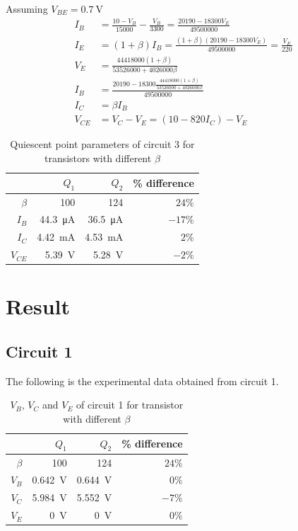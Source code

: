 \documentclass{article}
\begin{document}
Assuming $V_{BE}=\SI{0.7}{\volt}$
\begin{align}\label{eqn:ckt3}
  I_B    &= \frac{10-V_B}{15000}-\frac{V_B}{3300} = \frac{20190-18300V_E}{49500000} \\
  I_E    &= (1+\beta)I_B = \frac{(1+\beta)(20190-18300V_E)}{49500000} = \frac{V_E}{220}\\
  V_E    &= \frac{44418000(1+\beta)}{53526000+4026000\beta}\\
  I_B    &= \frac{20190-18300\frac{44418000(1+\beta)}{53526000+4026000\beta}}{49500000}\\
  I_C    &= \beta I_B\\
  V_{CE} &= V_C-V_E= (10 - 820I_C)-V_E
\end{align}

\begin{table}[H]
  \caption{Quiescent point parameters of circuit 3 for transistors with different $\beta$}
  \centering
    \begin{tabular}{rrrr}
      \toprule
       &$Q_1$&$Q_2$&\% difference\\
      \midrule
      $\beta$&100&124&$24\%$\\
      $I_B$&\SI{44.3}{\micro\ampere}&\SI{36.5}{\micro\ampere}&$-17\%$\\
      $I_C$&\SI{4.42}{\milli\ampere}&\SI{4.53}{\milli\ampere}&$2\%$\\
      $V_{CE}$&\SI{5.39}{\volt}&\SI{5.28}{\volt}&$-2\%$\\
    \bottomrule
  \end{tabular}
  \label{tab:ckt3}%
\end{table}

\section*{Result}
\subsection*{Circuit 1}
The following is the experimental data obtained from circuit 1.

\begin{table}[H]
  \caption{$V_B$, $V_C$ and $V_E$ of circuit 1 for transistor with different $\beta$}
  \centering
    \begin{tabular}{rrrr}
      \toprule
       &$Q_1$&$Q_2$&\% difference\\
      \midrule
      $\beta$&100&124&$24\%$\\
      $V_B$&\SI{0.642}{\volt}&\SI{0.644}{\volt}&$0\%$\\
      $V_C$&\SI{5.984}{\volt}&\SI{5.552}{\volt}&$-7\%$\\
      $V_E$&\SI{0}{\volt}&\SI{0}{\volt}&$0\%$\\
    \bottomrule
  \end{tabular}
  \label{tab:ckt1_exp}%
\end{table}
\end{document}
